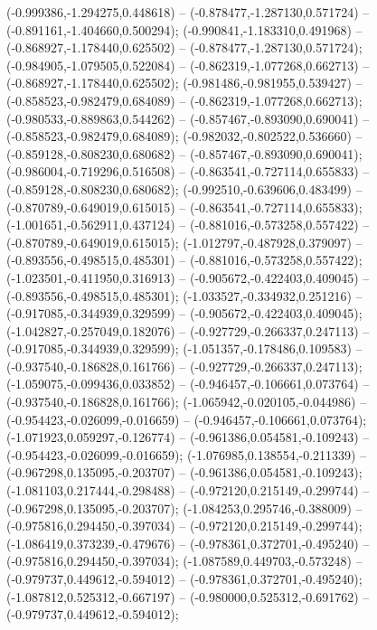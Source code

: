  (-0.999386,-1.294275,0.448618) -- (-0.878477,-1.287130,0.571724) -- (-0.891161,-1.404660,0.500294);
 (-0.990841,-1.183310,0.491968) -- (-0.868927,-1.178440,0.625502) -- (-0.878477,-1.287130,0.571724);
 (-0.984905,-1.079505,0.522084) -- (-0.862319,-1.077268,0.662713) -- (-0.868927,-1.178440,0.625502);
 (-0.981486,-0.981955,0.539427) -- (-0.858523,-0.982479,0.684089) -- (-0.862319,-1.077268,0.662713);
 (-0.980533,-0.889863,0.544262) -- (-0.857467,-0.893090,0.690041) -- (-0.858523,-0.982479,0.684089);
 (-0.982032,-0.802522,0.536660) -- (-0.859128,-0.808230,0.680682) -- (-0.857467,-0.893090,0.690041);
 (-0.986004,-0.719296,0.516508) -- (-0.863541,-0.727114,0.655833) -- (-0.859128,-0.808230,0.680682);
 (-0.992510,-0.639606,0.483499) -- (-0.870789,-0.649019,0.615015) -- (-0.863541,-0.727114,0.655833);
 (-1.001651,-0.562911,0.437124) -- (-0.881016,-0.573258,0.557422) -- (-0.870789,-0.649019,0.615015);
 (-1.012797,-0.487928,0.379097) -- (-0.893556,-0.498515,0.485301) -- (-0.881016,-0.573258,0.557422);
 (-1.023501,-0.411950,0.316913) -- (-0.905672,-0.422403,0.409045) -- (-0.893556,-0.498515,0.485301);
 (-1.033527,-0.334932,0.251216) -- (-0.917085,-0.344939,0.329599) -- (-0.905672,-0.422403,0.409045);
 (-1.042827,-0.257049,0.182076) -- (-0.927729,-0.266337,0.247113) -- (-0.917085,-0.344939,0.329599);
 (-1.051357,-0.178486,0.109583) -- (-0.937540,-0.186828,0.161766) -- (-0.927729,-0.266337,0.247113);
 (-1.059075,-0.099436,0.033852) -- (-0.946457,-0.106661,0.073764) -- (-0.937540,-0.186828,0.161766);
 (-1.065942,-0.020105,-0.044986) -- (-0.954423,-0.026099,-0.016659) -- (-0.946457,-0.106661,0.073764);
 (-1.071923,0.059297,-0.126774) -- (-0.961386,0.054581,-0.109243) -- (-0.954423,-0.026099,-0.016659);
 (-1.076985,0.138554,-0.211339) -- (-0.967298,0.135095,-0.203707) -- (-0.961386,0.054581,-0.109243);
 (-1.081103,0.217444,-0.298488) -- (-0.972120,0.215149,-0.299744) -- (-0.967298,0.135095,-0.203707);
 (-1.084253,0.295746,-0.388009) -- (-0.975816,0.294450,-0.397034) -- (-0.972120,0.215149,-0.299744);
 (-1.086419,0.373239,-0.479676) -- (-0.978361,0.372701,-0.495240) -- (-0.975816,0.294450,-0.397034);
 (-1.087589,0.449703,-0.573248) -- (-0.979737,0.449612,-0.594012) -- (-0.978361,0.372701,-0.495240);
 (-1.087812,0.525312,-0.667197) -- (-0.980000,0.525312,-0.691762) -- (-0.979737,0.449612,-0.594012);
